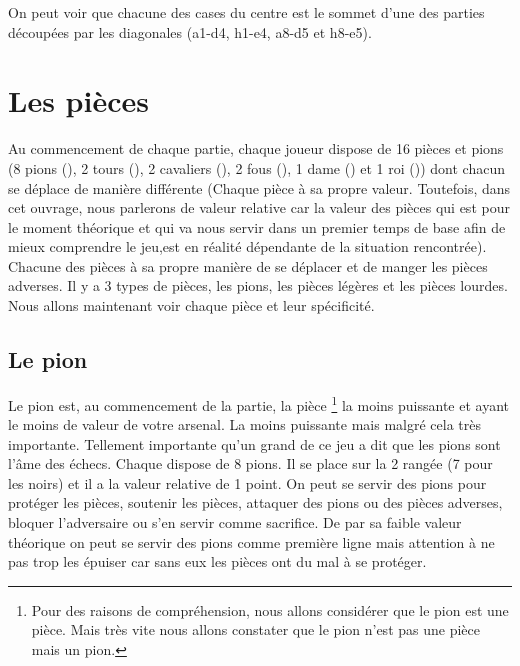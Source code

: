 \documentclass[a5paper,openany,twocolumn]{book}
\begin{document}
On peut voir que chacune des cases du centre est le sommet d'une des parties découpées par les diagonales (a1-d4, h1-e4, a8-d5 et h8-e5). 

\section{Les pièces}

Au commencement de chaque partie, chaque joueur dispose de 16 pièces et pions (8 pions (\sympawn), 2 tours (\symrook), 2 cavaliers (\symknight), 2 fous (\symbishop), 1 dame (\symqueen) et 1 roi (\symking)) dont chacun se déplace de manière différente (Chaque pièce à sa propre valeur. Toutefois, dans cet ouvrage, nous parlerons de valeur relative car la valeur des pièces qui est pour le moment théorique et qui va nous servir dans un premier temps de base afin de mieux comprendre le jeu,est en réalité dépendante de la situation rencontrée). Chacune des pièces à sa propre manière de se déplacer et de manger les pièces adverses. Il y a 3 types de pièces, les pions, les pièces légères et les pièces lourdes. \\

Nous allons maintenant voir chaque pièce et leur spécificité.

\subsection{Le pion} 

Le pion est, au commencement de la partie, la pièce \footnote{Pour des raisons de compréhension, nous allons considérer que le pion est une pièce. Mais très vite nous allons constater que le pion n'est pas une pièce mais un pion.} la moins puissante et ayant le moins de valeur de votre arsenal. La moins puissante mais malgré cela très importante. Tellement importante qu’un grand de ce jeu a dit que les pions sont l’âme des échecs. Chaque dispose de 8 pions. Il se place sur la 2 rangée (7 pour les noirs) et il a la valeur relative de 1 point. On peut se servir des pions pour protéger les pièces, soutenir les pièces, attaquer des pions ou des pièces adverses, bloquer l'adversaire ou s'en servir comme sacrifice. De par sa faible valeur théorique on peut se servir des pions comme première ligne mais attention à ne pas trop les épuiser car sans eux les pièces ont du mal à se protéger.
\end{document}

